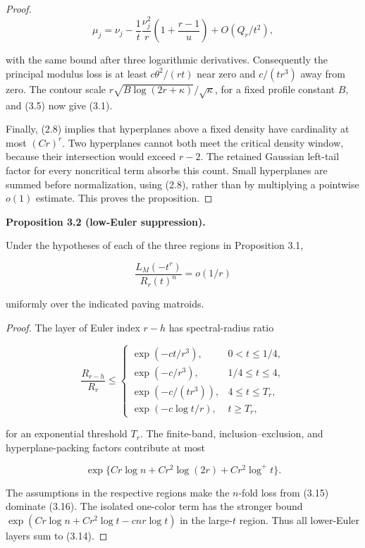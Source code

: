 \documentclass[10pt]{article}
\newenvironment{mdstatement}[1]
  {\par\Needspace{0.16\textheight}\noindent\textbf{#1.}\ \itshape}
  {\par\normalfont}
\begin{document}
\begin{proof}
\[
 \mu_j=\nu_j-\frac1t\frac{\nu_j^2}{r}
 \left(1+\frac{r-1}{u}\right)+O(Q_r/t^2), \tag{3.13}
\]

with the same bound after three logarithmic derivatives.  Consequently the
principal modulus loss is at least $c\theta^2/(rt)$ near zero and
$c/(tr^3)$ away from zero.  The contour scale
$r\sqrt{B\log(2r+\kappa)}/\sqrt\kappa$, for a fixed profile constant
$B$, and (3.5) now give (3.1).

Finally, (2.8) implies that hyperplanes above a fixed density have cardinality
at most $(Cr)^r$.  Two hyperplanes cannot both meet the critical density
window, because their intersection would exceed $r-2$.  The retained
Gaussian left-tail factor for every noncritical term absorbs this count.
Small hyperplanes are summed before normalization, using (2.8), rather than by
multiplying a pointwise $o(1)$ estimate.  This proves the proposition.

\end{proof}


\begin{mdstatement}{Proposition 3.2 (low-Euler suppression)}


Under the hypotheses of each of the three regions in Proposition 3.1,

\[
 \frac{L_M(-t^r)}{R_r(t)^n}=o(1/r) \tag{3.14}
\]

uniformly over the indicated paving matroids.

\end{mdstatement}

\begin{proof}


The layer of Euler index $r-h$ has spectral-radius ratio

\[
 \frac{R_{r-h}}{R_r}\le
 \begin{cases}
  \exp(-ct/r^3),&0<t\le1/4,\\
  \exp(-c/r^3),&1/4\le t\le4,\\
  \exp(-c/(tr^3)),&4\le t\le T_r,\\
  \exp(-c\log t/r),&t\ge T_r,
 \end{cases} \tag{3.15}
\]

for an exponential threshold $T_r$.  The finite-band, inclusion--exclusion,
and hyperplane-packing factors contribute at most

\[
 \exp\{Cr\log n+Cr^2\log(2r)+Cr^2\log^+t\}. \tag{3.16}
\]

The assumptions in the respective regions make the $n$-fold loss from
(3.15) dominate (3.16).  The isolated one-color term has the stronger bound
$\exp(Cr\log n+Cr^2\log t-cnr\log t)$ in the large-$t$ region.
Thus all lower-Euler layers sum to (3.14).
\end{proof}
\end{document}
